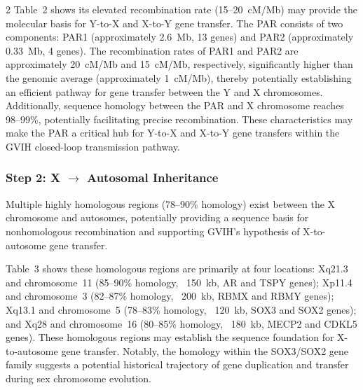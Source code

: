 \documentclass{base}
\begin{document}
\begin{multicols}{2}
Table~2 shows its elevated recombination rate (15--20~cM/Mb) may provide the molecular basis for Y-to-X and X-to-Y gene transfer. The PAR consists of two components: PAR1 (approximately 2.6~Mb, 13 genes) and PAR2 (approximately 0.33~Mb, 4 genes). The recombination rates of PAR1 and PAR2 are approximately 20~cM/Mb and 15~cM/Mb, respectively, significantly higher than the genomic average (approximately 1~cM/Mb), thereby potentially establishing an efficient pathway for gene transfer between the Y and X chromosomes. Additionally, sequence homology between the PAR and X chromosome reaches 98--99\%, potentially facilitating precise recombination. These characteristics may make the PAR a critical hub for Y-to-X and X-to-Y gene transfers within the GVIH closed-loop transmission pathway.



\subsubsection{Step 2: X $\rightarrow$ Autosomal Inheritance}
Multiple highly homologous regions (78--90\% homology) exist between the X chromosome and autosomes, potentially providing a sequence basis for nonhomologous recombination and supporting GVIH's hypothesis of X-to-autosome gene transfer. 

Table~3 shows these homologous regions are primarily at four locations: Xq21.3 and chromosome~11 (85--90\% homology, ~150~kb, AR and TSPY genes); Xp11.4 and chromosome~3 (82--87\% homology, ~200~kb, RBMX and RBMY genes); Xq13.1 and chromosome~5 (78--83\% homology, ~120~kb, SOX3 and SOX2 genes); and Xq28 and chromosome~16 (80--85\% homology, ~180~kb, MECP2 and CDKL5 genes). These homologous regions may establish the sequence foundation for X-to-autosome gene transfer. Notably, the homology within the SOX3/SOX2 gene family suggests a potential historical trajectory of gene duplication and transfer during sex chromosome evolution.





\end{multicols}
\end{document}
